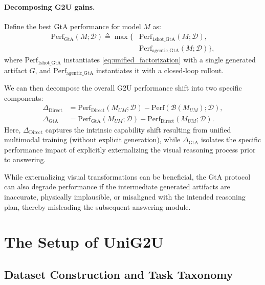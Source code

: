 \documentclass{article}
\theoremstyle{plain}
\theoremstyle{definition}
\theoremstyle{remark}
\begin{document}
\paragraph{Decomposing G2U gains.}
Define the best GtA performance for model $M$ as:
\begin{equation}
\begin{aligned}
\mathrm{Perf}_{\mathrm{GtA}}(M;\mathcal{D})
\triangleq
\max\Big\{
&\mathrm{Perf}_{\mathrm{1shot\_GtA}}(M;\mathcal{D}), \\
&\mathrm{Perf}_{\mathrm{agentic\_GtA}}(M;\mathcal{D})
\Big\},
\end{aligned}
\label{eq:perf_gta_def}
\end{equation}
where $\mathrm{Perf}_{\mathrm{1shot\_GtA}}$ instantiates \eqref{eq:unified_factorization} with a single generated artifact $G$, and $\mathrm{Perf}_{\mathrm{agentic\_GtA}}$ instantiates it with a closed-loop rollout.

We can then decompose the overall G2U performance shift into two specific components:
\begin{equation}
\begin{aligned}
\Delta_{\mathrm{Direct}}
&= \mathrm{Perf}_{\mathrm{Direct}}(M_{UM};\mathcal{D})-\mathrm{Perf}(\mathcal{B}(M_{UM});\mathcal{D}), \\
\Delta_{\mathrm{GtA}}
&= \mathrm{Perf}_{\mathrm{GtA}}(M_{UM};\mathcal{D})-\mathrm{Perf}_{\mathrm{Direct}}(M_{UM};\mathcal{D}).
\end{aligned}
\label{eq:g2u_decomp}
\end{equation}
Here, $\Delta_{\mathrm{Direct}}$ captures the intrinsic capability shift resulting from unified multimodal training (without explicit generation), while $\Delta_{\mathrm{GtA}}$ isolates the specific performance impact of explicitly externalizing the visual reasoning process prior to answering.

While externalizing visual transformations can be beneficial, the GtA protocol can also degrade performance if the intermediate generated artifacts are inaccurate, physically implausible, or misaligned with the intended reasoning plan, thereby misleading the subsequent answering module.



\section{The Setup of UniG2U}
\subsection{Dataset Construction and Task Taxonomy}
\end{document}
